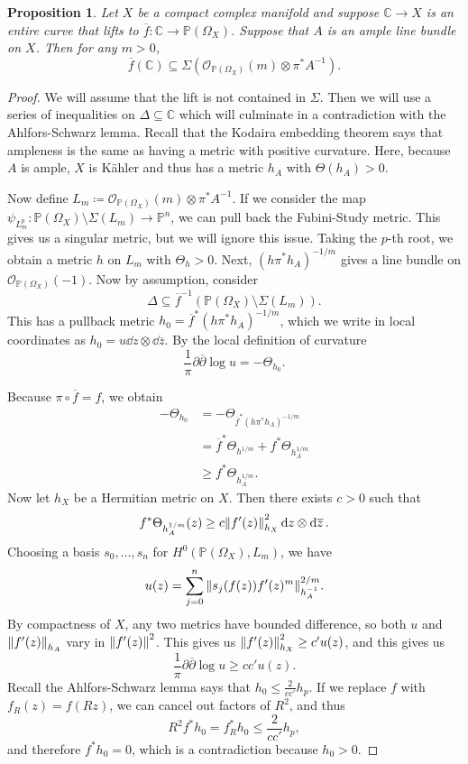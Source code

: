 \documentclass[leqno, openany]{memoir}
\newtheorem{prop}[thm]{Proposition}
\theoremstyle{definition}
\theoremstyle{remark}
\theoremstyle{plain}
\theoremstyle{definition}
\theoremstyle{remark}
\newcommand{\C}{\mathbb{C}}
\renewcommand{\P}{\mathbb{P}}
\newcommand{\mc}[1]{\mathcal{#1}}
\newcommand{\ol}[1]{\overline{#1}}
\begin{document}
\begin{prop}
    Let $X$ be a compact complex manifold and suppose $\C \to X$ is an entire curve that lifts to $\ol{f} \colon \C \to \P(\Omega_X)$. Suppose that $A$ is an ample line bundle on $X$. Then for any $m > 0$, 
    \[ \ol{f}(\C) \subseteq \Sigma(\mc{O}_{\P(\Omega_X)}(m) \otimes \pi^* A^{-1}). \]
\end{prop}

\begin{proof}
    We will assume that the lift is not contained in $\Sigma$. Then we will use a series of inequalities on $\Delta \subseteq \C$ which will culminate in a contradiction with the Ahlfors-Schwarz lemma. Recall that the Kodaira embedding theorem says that ampleness is the same as having a metric with positive curvature. Here, because $A$ is ample, $X$ is K\"ahler and thus has a metric $h_A$ with $\Theta(h_A) > 0$.

    Now define $L_m \coloneqq \mc{O}_{\P(\Omega_X)}(m) \otimes \pi^* A^{-1}$. If we consider the map $\psi_{L_m^p} \colon \P(\Omega_X) \setminus \Sigma(L_m) \to \P^n$, we can pull back the Fubini-Study metric. This gives us a singular metric, but we will ignore this issue. Taking the $p$-th root, we obtain a metric $h$ on $L_m$ with $\Theta_h > 0$. Next, $(h \pi^* h_A)^{-1/m}$ gives a line bundle on $\mc{O}_{\P(\Omega_X)}(-1)$. Now by assumption, consider
    \[ \Delta \subseteq \ol{f}^{-1}(\P(\Omega_X) \setminus \Sigma(L_m)). \]
    This has a pullback metric $h_0 = \ol{f}^* (h \pi^* h_A)^{-1/m}$, which we write in local coordinates as $h_0 = u \dd{z} \otimes \dd{\ol{z}}$. By the local definition of curvature
    \[ \frac{1}{\pi} \partial \ol{\partial} \log u = -\Theta_{h_0}. \]

    Because $\pi \circ \ol{f} = f$, we obtain
    \begin{align*}
        -\Theta_{h_0} &= -\Theta_{\ol{f}^* (h \pi^* h_A)^{-1/m}} \\
        &= \ol{f}^* \Theta_{h^{1/m}} + f^* \Theta_{h_A^{1/m}} \\
        &\geq f^* \Theta_{h_A^{1/m}}.
    \end{align*}
    Now let $h_X$ be a Hermitian metric on $X$. Then there exists $c > 0$ such that
    \[ f^* \Theta_{h_A^{1/m}} (z) \geq c \norm{f'(z)}_{h_X}^2 \dd{z} \otimes \dd{\ol{z}}. \]
    Choosing a basis $s_0, \ldots, s_n$ for $H^0(\P(\Omega_X), L_m)$, we have
    \[ u(z) = \sum_{j=0}^n \norm{s_j(f(z)) f'(z)^m}_{h_A^{-1}}^{2/m}. \]
    By compactness of $X$, any two metrics have bounded difference, so both $u$ and $\norm{f'(z)}_{h_A}$ vary in $\norm{f'(z)}^2$. This gives us $\norm{f'(z)}_{h_X}^2 \geq c' u(z)$, and this gives us 
    \[ \frac{1}{\pi} \partial \ol{\partial} \log u \geq cc' u(z). \]
    Recall the Ahlfors-Schwarz lemma says that $h_0 \leq \frac{2}{cc'} h_p$. If we replace $f$ with $f_R(z) = f(Rz)$, we can cancel out factors of $R^2$, and thus
    \[ R^2 f^* h_0 = f_R^* h_0 \leq \frac{2}{cc'} h_p, \]
    and therefore $f^* h_0 = 0$, which is a contradiction because $h_0 > 0$.
\end{proof}
\end{document}
